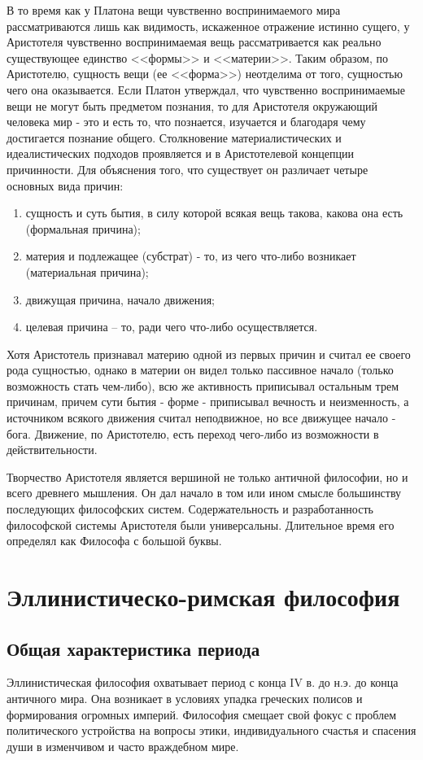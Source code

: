 \documentclass[12pt,a4paper]{article}
\begin{document}
	\par В то время как у Платона вещи чувственно воспринимаемого мира рассматриваются лишь как видимость, искаженное отражение истинно сущего, у Аристотеля чувственно воспринимаемая вещь рассматривается как реально существующее единство <<формы>> и <<материи>>. Таким образом, по Аристотелю, сущность вещи (ее <<форма>>) неотделима от того, сущностью чего она оказывается. Если Платон утверждал, что чувственно воспринимаемые вещи не могут быть предметом познания, то для Аристотеля окружающий человека мир - это и есть то, что познается, изучается и благодаря чему достигается познание общего. Столкновение материалистических и идеалистических подходов проявляется и в Аристотелевой концепции причинности. Для объяснения того, что существует он различает четыре основных вида причин:
	\begin{enumerate}
		\item сущность и суть бытия, в силу которой всякая вещь такова, какова она есть (формальная причина);
		\item материя и подлежащее (субстрат) - то, из чего что-либо возникает (материальная причина);
		\item движущая причина, начало движения;
		\item целевая причина -- то, ради чего что-либо осуществляется. 
	\end{enumerate}
	
	Хотя Аристотель признавал материю одной из первых причин и считал ее своего рода сущностью, однако в материи он видел только пассивное начало (только возможность стать чем-либо), всю же активность приписывал остальным трем причинам, причем сути бытия - форме - приписывал вечность и неизменность, а источником всякого движения считал неподвижное, но все движущее начало - бога. Движение, по Аристотелю, есть переход чего-либо из возможности в действительности. 
	\par Творчество Аристотеля является вершиной не только античной философии, но и всего древнего мышления. Он дал начало в том или ином смысле большинству последующих философских систем. Содержательность и разработанность философской системы Аристотеля были универсальны. Длительное время его определял как Философа с большой буквы.
	
	\section{Эллинистическо-римская философия~\checkmark}
	
	\subsection{Общая характеристика периода}
	Эллинистическая философия охватывает период с конца IV в. до н.э. до конца античного мира. Она возникает в условиях упадка греческих полисов и формирования огромных империй. Философия смещает свой фокус с проблем политического устройства на вопросы этики, индивидуального счастья и спасения души в изменчивом и часто враждебном мире.
	
\end{document}
